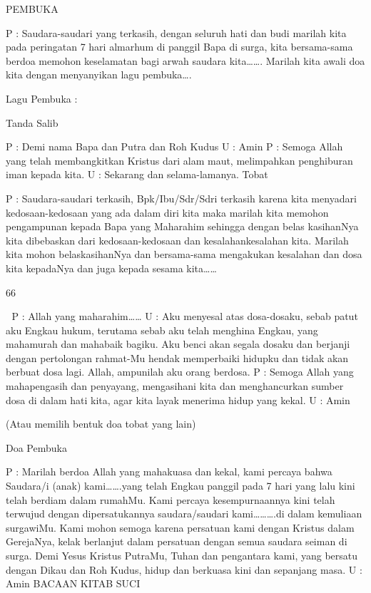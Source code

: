PEMBUKA 

P 
: Saudara-saudari yang terkasih, dengan seluruh hati dan 
budi marilah kita pada peringatan 7 hari almarhum di 
panggil Bapa di surga, kita bersama-sama berdoa memohon 
keselamatan bagi arwah saudara kita……. 
Marilah kita awali doa kita dengan menyanyikan lagu 
pembuka…. 

Lagu Pembuka : 

Tanda Salib 

P 
: Demi nama Bapa dan Putra dan Roh Kudus 
U 
: Amin 
P 
: Semoga Allah yang telah membangkitkan Kristus dari 
alam maut, melimpahkan penghiburan iman kepada kita. 
U 
: Sekarang dan selama-lamanya. 
Tobat 

P 
: Saudara-saudari terkasih, 
Bpk/Ibu/Sdr/Sdri terkasih karena kita menyadari 
kedosaan-kedosaan yang ada dalam diri kita maka 
marilah kita memohon pengampunan kepada Bapa yang 
Maharahim sehingga dengan belas kasihanNya kita 
dibebaskan dari kedosaan-kedosaan dan kesalahankesalahan 
kita. Marilah kita mohon belaskasihanNya dan 
bersama-sama mengakukan kesalahan dan dosa kita 
kepadaNya dan juga kepada sesama kita…… 

66 



P 
: Allah yang maharahim…… 
U 
: Aku menyesal atas dosa-dosaku, sebab patut aku Engkau 
hukum, terutama sebab aku telah menghina Engkau, yang 
mahamurah dan mahabaik bagiku. Aku benci akan segala 
dosaku dan berjanji dengan pertolongan rahmat-Mu 
hendak memperbaiki hidupku dan tidak akan berbuat dosa 
lagi. Allah, ampunilah aku orang berdosa. 
P : Semoga Allah yang mahapengasih dan penyayang, 
mengasihani kita dan menghancurkan sumber dosa di dalam 
hati kita, agar kita layak menerima hidup yang kekal. 
U : Amin 

(Atau memilih bentuk doa tobat yang lain) 

Doa Pembuka 

P 
: Marilah berdoa 
Allah yang mahakuasa dan kekal, kami percaya bahwa 
Saudara/i (anak) kami…….yang telah Engkau panggil pada 
7 hari yang lalu kini telah berdiam dalam rumahMu. Kami 
percaya kesempurnaannya kini telah terwujud dengan 
dipersatukannya saudara/saudari kami……….di dalam 
kemuliaan surgawiMu. Kami mohon semoga karena 
persatuan kami dengan Kristus dalam GerejaNya, kelak 
berlanjut dalam persatuan dengan semua saudara seiman di 
surga. 
Demi Yesus Kristus PutraMu, Tuhan dan pengantara kami, 
yang bersatu dengan Dikau dan Roh Kudus, hidup dan 
berkuasa kini dan sepanjang masa. 
U 
: Amin 
BACAAN KITAB SUCI 

